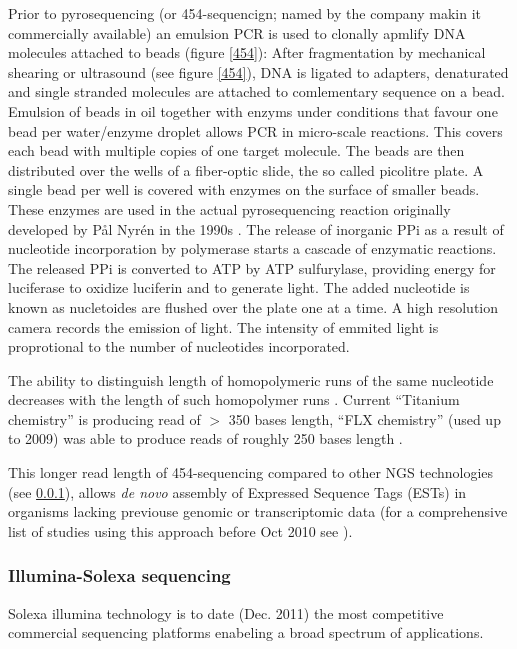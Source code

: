 Prior to pyrosequencing (or 454-sequencign; named by the company makin
it commercially available) an emulsion PCR is used to clonally apmlify
DNA molecules attached to beads (figure \ref{454}): After
fragmentation by mechanical shearing or ultrasound \cite{pmid20298868}
(see figure \ref{454}), DNA is ligated to adapters, denaturated and
single stranded molecules are attached to comlementary sequence on a
bead. Emulsion of beads in oil together with enzyms under conditions
that favour one bead per water/enzyme droplet allows PCR in
micro-scale reactions. This covers each bead with multiple copies of
one target molecule. The beads are then distributed over the wells of
a fiber-optic slide, the so called picolitre plate. A single bead per
well is covered with enzymes on the surface of smaller beads. These
enzymes are used in the actual pyrosequencing reaction originally
developed by P\r{a}l Nyr\'{e}n in the 1990s \cite{pmid17185753}. The
release of inorganic PPi as a result of nucleotide incorporation by
polymerase starts a cascade of enzymatic reactions. The released PPi
is converted to ATP by ATP sulfurylase, providing energy for
luciferase to oxidize luciferin and to generate light. The added
nucleotide is known as nucletoides are flushed over the plate one at a
time. A high resolution camera records the emission of light. The
intensity of emmited light is proprotional to the number of
nucleotides incorporated.

The ability to distinguish length of homopolymeric runs of the same
nucleotide decreases with the length of such homopolymer runs
\cite{pmid21685085}. Current ``Titanium chemistry'' is producing read
of $>$ 350 bases length, ``FLX chemistry'' (used up to 2009) was able
to produce reads of roughly 250 bases length \cite{pmid21514329}.

This longer read length of 454-sequencing \cite{pmid16056220} compared
to other NGS technologies (see \ref{sec:ill-seq}), allows \textit{de
  novo} assembly of Expressed Sequence Tags (ESTs) in organisms
lacking previouse genomic or transcriptomic data (for a comprehensive
list of studies using this approach before Oct 2010 see
\cite{pmid20950480}).

\subsubsection{Illumina-Solexa sequencing}
\label{sec:ill-seq}

Solexa illumina technology is to date (Dec. 2011) the most competitive
commercial sequencing platforms enabeling a broad spectrum of
applications.

